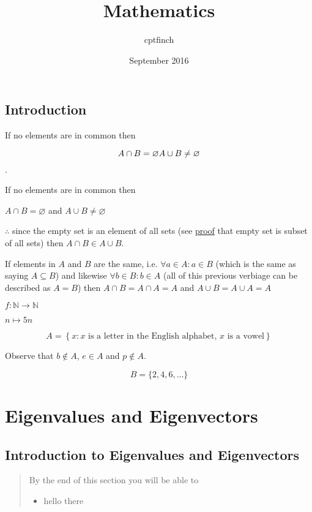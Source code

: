 \documentclass[pagesize=auto, version=last, chapterprefix=true]{scrbook}
\title{Mathematics}
\author{cptfinch }
\date{September 2016}
\begin{document}
\maketitle

\section{Introduction}

If no elements are in common then  

\begin{equation*}
A \cap B = \varnothing \\
A \cup B \neq \varnothing
\end{equation*} .

If no elements are in common then
\begin{center}
$ A \cap B = \varnothing $ and $ A \cup B \neq \varnothing $
\end{center}

$\therefore$ since the empty set is an element of all sets (see \href{https://proofwiki.org/wiki/Empty_Set_is_Subset_of_All_Sets}{proof} that empty set is subset of all sets) then $ A\cap B \in A \cup B $.

If elements in $A$ and $B$ are the same, i.e. $ \forall a \in A : a \in B $ (which is the same as saying $A \subseteq B$) and likewise $ \forall b \in B : b \in A $ (all of this previous verbiage can be described as $A = B$) then $A \cap B = A\cap A = A $ and $A\cup B = A\cup A = A$


$ f:\mathbb N\to\mathbb N $

$n\mapsto5n$

\[A=\left\{x:x \text{ is a letter in the English alphabet, }x \text{ is a vowel} \right\}\]

Observe that $b \notin A$, $e \in A$ and $p \notin A$.

\[B=\{2,4,6,\dots \}\]

\chapter{Eigenvalues and Eigenvectors}
\section{Introduction to Eigenvalues and Eigenvectors}

\begin{quote}
By the end of this section you will be able to
\begin{itemize}
    \item hello there
\end{itemize}
\end{quote}
\end{document}
